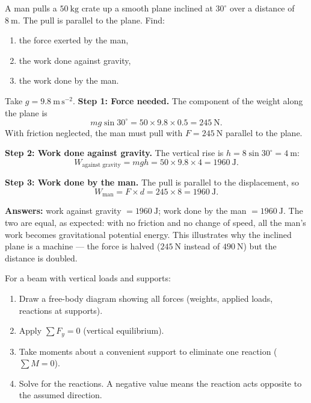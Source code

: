 \documentclass[11pt]{article}
\begin{document}
\begin{exoresolu}
A man pulls a $50\ \mathrm{kg}$ crate up a smooth plane inclined at $30^\circ$ over a distance of $8\ \mathrm{m}$. The pull is parallel to the plane. Find:
\begin{enumerate}
\item the force exerted by the man,
\item the work done against gravity,
\item the work done by the man.
\end{enumerate}
Take $g = 9.8\ \mathrm{m\,s^{-2}}$.
\tcblower
\textbf{Step 1: Force needed.} The component of the weight along the plane is
\[
mg\sin 30^\circ = 50 \times 9.8 \times 0.5 = 245\ \mathrm{N}.
\]
With friction neglected, the man must pull with $F = 245\ \mathrm{N}$ parallel to the plane.

\textbf{Step 2: Work done against gravity.} The vertical rise is $h = 8\sin 30^\circ = 4\ \mathrm{m}$:
\[
W_{\text{against gravity}} = mgh = 50 \times 9.8 \times 4 = 1960\ \mathrm{J}.
\]

\textbf{Step 3: Work done by the man.} The pull is parallel to the displacement, so
\[
W_{\text{man}} = F \times d = 245 \times 8 = 1960\ \mathrm{J}.
\]

\textbf{Answers:} work against gravity $= 1960\ \mathrm{J}$; work done by the man $= 1960\ \mathrm{J}$. The two are equal, as expected: with no friction and no change of speed, all the man's work becomes gravitational potential energy. This illustrates why the inclined plane is a machine — the force is halved ($245\ \mathrm{N}$ instead of $490\ \mathrm{N}$) but the distance is doubled.
\end{exoresolu}

\begin{methode}
For a beam with vertical loads and supports:
\begin{enumerate}
\item Draw a free-body diagram showing all forces (weights, applied loads, reactions at supports).
\item Apply $\sum F_y = 0$ (vertical equilibrium).
\item Take moments about a convenient support to eliminate one reaction ($\sum M = 0$).
\item Solve for the reactions. A negative value means the reaction acts opposite to the assumed direction.
\end{enumerate}
\end{methode}
\end{document}

